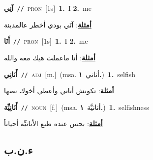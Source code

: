 \documentclass[10pt,a4paper,twoside]{article} %
\begin{document}
\begin{multicols}{2}
{\setlength\topsep{0pt}\textbf{\foreignlanguage{arabic}{آنِي}}\ {\color{gray}\texttt{//}\color{black}}\ \textsc{pron}\ [1s]\ \textbf{1.}~I  \textbf{2.}~me\  \begin{flushright}\color{gray}\foreignlanguage{arabic}{\textbf{\underline{\foreignlanguage{arabic}{أمثلة}}}: آنَي بودي أخطر عالمدينة}\end{flushright}\color{black}} \vspace{2mm}

{\setlength\topsep{0pt}\textbf{\foreignlanguage{arabic}{أَنَا}}\ {\color{gray}\texttt{//}\color{black}}\ \textsc{pron}\ [1s]\ \textbf{1.}~I  \textbf{2.}~me\  \begin{flushright}\color{gray}\foreignlanguage{arabic}{\textbf{\underline{\foreignlanguage{arabic}{أمثلة}}}: أنا ماعملت هيك معه والله}\end{flushright}\color{black}} \vspace{2mm}

{\setlength\topsep{0pt}\textbf{\foreignlanguage{arabic}{أَنَانِي}}\ {\color{gray}\texttt{//}\color{black}}\ \textsc{adj}\ [m.]\ \color{gray}(msa. \foreignlanguage{arabic}{أناني}~\foreignlanguage{arabic}{\textbf{١.}})\color{black}\ \textbf{1.}~selfish\  \begin{flushright}\color{gray}\foreignlanguage{arabic}{\textbf{\underline{\foreignlanguage{arabic}{أمثلة}}}: تكونش أناني وأعطي أخوك نصها}\end{flushright}\color{black}} \vspace{2mm}

{\setlength\topsep{0pt}\textbf{\foreignlanguage{arabic}{أَنَانِيِّة}}\ {\color{gray}\texttt{//}\color{black}}\ \textsc{noun}\ [f.]\ \color{gray}(msa. \foreignlanguage{arabic}{أنانيَّة}~\foreignlanguage{arabic}{\textbf{١.}})\color{black}\ \textbf{1.}~selfishness\  \begin{flushright}\color{gray}\foreignlanguage{arabic}{\textbf{\underline{\foreignlanguage{arabic}{أمثلة}}}: بحس عنده طبع الأنانيِّة أحياناً}\end{flushright}\color{black}} \vspace{2mm}

\vspace{-3mm}
\subsection*{\color{blue}\foreignlanguage{arabic}{ء.ن.ب}\color{blue}{}} 


\end{multicols}
\end{document}
